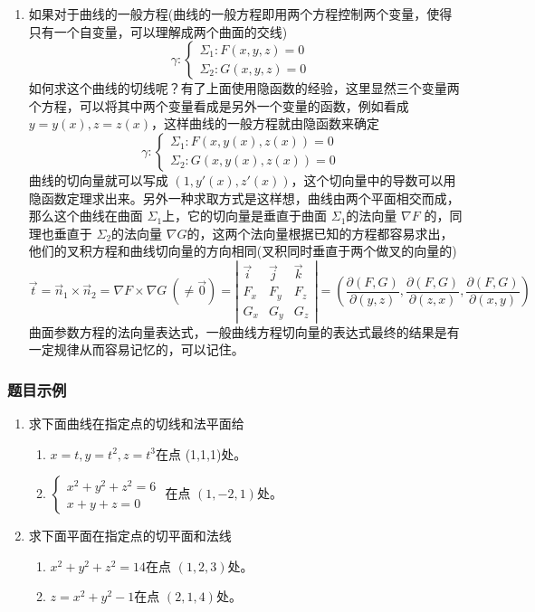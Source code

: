 \begin{enumerate}
    \item 如果对于曲线的一般方程(曲线的一般方程即用两个方程控制两个变量，使得只有一个自变量，可以理解成两个曲面的交线)
    $$
    \gamma:\begin{cases}\Sigma_1:F(x,y,z)=0\\\Sigma_2:G(x,y,z)=0&\end{cases}
    $$
    如何求这个曲线的切线呢？有了上面使用隐函数的经验，这里显然三个变量两个方程，可以将其中两个变量看成是另外一个变量的函数，例如看成 $y = y(x), z=z(x)$，这样曲线的一般方程就由隐函数来确定
    $$
    \gamma:\begin{cases}\Sigma_1:F(x,y(x),z(x))=0\\\Sigma_2:G(x,y(x),z(x))=0&\end{cases}
    $$
    曲线的切向量就可以写成 $(1,y'(x),z'(x))$，这个切向量中的导数可以用隐函数定理求出来。另外一种求取方式是这样想，曲线由两个平面相交而成，那么这个曲线在曲面 $\Sigma _1$上，它的切向量是垂直于曲面 $\Sigma _1$的法向量 $\nabla F$ 的，同理也垂直于 $\Sigma _2$的法向量 $\nabla G$的，这两个法向量根据已知的方程都容易求出，他们的叉积方程和曲线切向量的方向相同(叉积同时垂直于两个做叉的向量的)
    $$
    \vec{t}=\vec{n}_{1}\times\vec{n}_{2}=\nabla F\times\nabla G\mathrm{~}(\neq\vec{0}) \left.=\left|\begin{array}{ccc}\vec{i}&\vec{j}&\vec{k}\\F_x&F_y&F_z\\G_x&G_y&G_z\end{array}\right.\right|=\left(\frac{\partial(F,G)}{\partial(y,z)},\frac{\partial(F,G)}{\partial(z,x)},\frac{\partial(F,G)}{\partial(x,y)}\right)
    $$
    曲面参数方程的法向量表达式，一般曲线方程切向量的表达式最终的结果是有一定规律从而容易记忆的，可以记住。
\end{enumerate}

\subsubsection{题目示例}
\begin{enumerate}
    \item 求下面曲线在指定点的切线和法平面给
    \begin{enumerate}[(1)]
        \item $x = t, y = t^2 , z = t^3$在点 (1,1,1)处。
        \item $\begin{cases}
            x^2 + y^2 +z^2 = 6 \\
            x + y + z =0 
        \end{cases}$
        在点 $(1,-2,1)$处。
    \end{enumerate}

    \item 求下面平面在指定点的切平面和法线
    \begin{enumerate}[(1)]
        \item $x^2 + y^2 + z^2 = 14$在点 $(1,2,3)$处。
        \item $z = x^2 + y^2 -1$在点 $(2,1,4)$处。
    \end{enumerate}
\end{enumerate}

